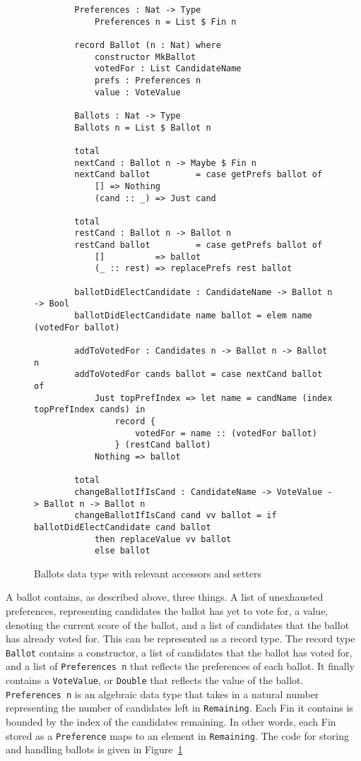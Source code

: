 \begin{figure}[htbp!!!!!!!!!!!!!!]
	\caption{Ballots data type with relevant accessors and setters}
	\label{ballots_code}
    \begin{lstlisting}
        Preferences : Nat -> Type
            Preferences n = List $ Fin n

        record Ballot (n : Nat) where
            constructor MkBallot
            votedFor : List CandidateName
            prefs : Preferences n
            value : VoteValue
        
        Ballots : Nat -> Type
        Ballots n = List $ Ballot n

        total
        nextCand : Ballot n -> Maybe $ Fin n
        nextCand ballot         = case getPrefs ballot of
            [] => Nothing
            (cand :: _) => Just cand

        total
        restCand : Ballot n -> Ballot n
        restCand ballot         = case getPrefs ballot of
            []          => ballot
            (_ :: rest) => replacePrefs rest ballot

        ballotDidElectCandidate : CandidateName -> Ballot n -> Bool
        ballotDidElectCandidate name ballot = elem name (votedFor ballot)
        
        addToVotedFor : Candidates n -> Ballot n -> Ballot n
        addToVotedFor cands ballot = case nextCand ballot of
            Just topPrefIndex => let name = candName (index topPrefIndex cands) in 
                record { 
                    votedFor = name :: (votedFor ballot) 
                } (restCand ballot)
            Nothing => ballot
        
        total
        changeBallotIfIsCand : CandidateName -> VoteValue -> Ballot n -> Ballot n
        changeBallotIfIsCand cand vv ballot = if ballotDidElectCandidate cand ballot
            then replaceValue vv ballot
            else ballot
    \end{lstlisting}
\end{figure}


A ballot contains, as described above, three things. A list of unexhausted
preferences, representing candidates the ballot has yet to vote for, a value,
denoting the current score of the ballot, and a list of candidates that the
ballot has already voted for. This can be represented as a record type. The
record type \texttt{Ballot} contains a constructor, a list of candidates that
the ballot has voted for, and a list of \texttt{Preferences n} that reflects the
preferences of each ballot. It finally contains a \texttt{VoteValue}, or
\texttt{Double} that reflects the value of the ballot. \texttt{Preferences n} is
an algebraic data type that takes in a natural number representing the number of
candidates left in \texttt{Remaining}. Each Fin it contains is bounded by the
index of the candidates remaining. In other words, each Fin stored as a
\texttt{Preference} maps to an element in \texttt{Remaining}. The code for storing
and handling ballots is given in Figure~\ref{ballots_code}

